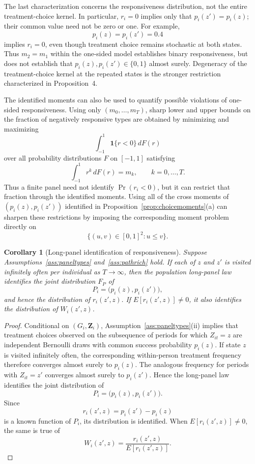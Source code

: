 \documentclass[11pt]{article}
\newtheorem{corollary}{Corollary}
\newcommand{\1}{\mathbf{1}}
\begin{document}
The last characterization concerns the responsiveness distribution, not the
entire treatment-choice kernel. In particular, $r_i=0$ implies only that
$p_i(z')=p_i(z)$; their common value need not be zero or one. For example,
\[
p_i(z)=p_i(z')=0.4
\]
implies $r_i=0$, even though treatment choice remains stochastic at both
states. Thus $m_2=m_1$ within the one-sided model establishes binary
responsiveness, but does not establish that
$p_i(z),p_i(z')\in\{0,1\}$ almost surely. Degeneracy of the treatment-choice
kernel at the repeated states is the stronger restriction characterized in
Proposition~4.

The identified moments can also be used to quantify possible violations of
one-sided responsiveness. Using only $(m_0,\ldots,m_T)$, sharp lower and
upper bounds on the fraction of negatively responsive types are obtained by
minimizing and maximizing
\[
\int_{-1}^{1}\mathbf{1}\{r<0\}\,dF(r)
\]
over all probability distributions $F$ on $[-1,1]$ satisfying
\[
\int_{-1}^{1}r^k\,dF(r)=m_k,
\qquad k=0,\ldots,T.
\]
Thus a finite panel need not identify $\Pr(r_i<0)$, but it can restrict that
fraction through the identified moments. Using all of the cross moments of
$(p_i(z),p_i(z'))$ identified in Proposition~\ref{prop:choicemoments}(a)
can sharpen these restrictions by imposing the corresponding moment problem
directly on
\[
\{(u,v)\in[0,1]^2:u\leq v\}.
\]

\begin{corollary}[Long-panel identification of responsiveness]
\label{cor:longpanelchoice}
Suppose Assumptions~\ref{ass:paneltypes} and~\ref{ass:pathrich} hold. If each
of $z$ and $z'$ is visited infinitely often per individual as $T\to\infty$,
then the population long-panel law identifies the joint distribution $F_P$
of
\[
P_i=\bigl(p_i(z),p_i(z')\bigr),
\]
and hence the distribution of $r_i(z',z)$. If $E[r_i(z',z)]\neq0$, it also
identifies the distribution of $W_i(z',z)$.
\end{corollary}

\begin{proof}
Conditional on $(G_i,\mathbf Z_i)$, Assumption~\ref{ass:paneltypes}(ii)
implies that treatment choices observed on the subsequence of periods for
which $Z_{it}=z$ are independent Bernoulli draws with common success
probability $p_i(z)$. If state $z$ is visited infinitely often, the
corresponding within-person treatment frequency therefore converges almost
surely to $p_i(z)$. The analogous frequency for periods with $Z_{it}=z'$
converges almost surely to $p_i(z')$. Hence the long-panel law identifies
the joint distribution of
\[
P_i=\bigl(p_i(z),p_i(z')\bigr).
\]
Since
\[
r_i(z',z)=p_i(z')-p_i(z)
\]
is a known function of $P_i$, its distribution is identified. When
$E[r_i(z',z)]\neq0$, the same is true of
\[
W_i(z',z)=\frac{r_i(z',z)}{E[r_i(z',z)]}.
\]
\end{proof}
\end{document}
